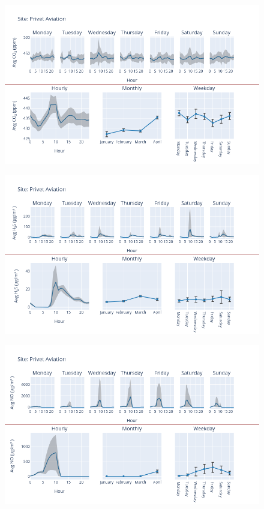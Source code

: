 \documentclass[12pt, oneside]{book}
\begin{document}
{ 
{\begin{figure}[H] 
 \centering 
\includegraphics[width=.88\textwidth, keepaspectratio]{image116} 
 \end{figure}}{} 

{\begin{figure}[H] 
 \centering 
\includegraphics[width=.88\textwidth, keepaspectratio]{image117} 
 \end{figure}}{} 

{\begin{figure}[H] 
 \centering 
\includegraphics[width=.88\textwidth, keepaspectratio]{image118} 
 \end{figure}}{} 

}
\end{document}
